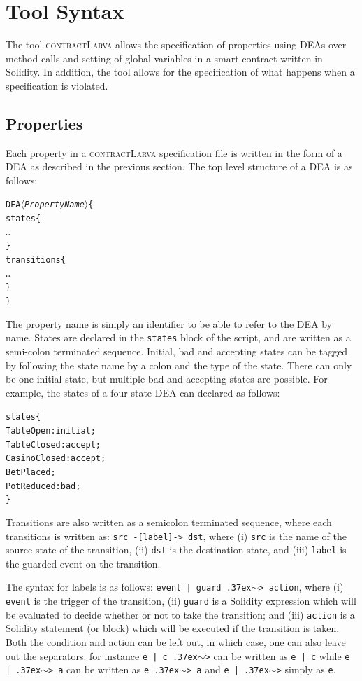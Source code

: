 \documentclass{article}
\newcommand{\contractlarva}{\textsc{contractLarva}\xspace}
\newcommand{\keyword}[1]{\textit{$\langle$#1$\rangle$}}
\newcommand{\tildearrow}{{\raise.37ex\hbox{$\scriptstyle\mathtt{\sim}$}}>\xspace}
\begin{document}
  \section{Tool Syntax}
  The tool \contractlarva allows the specification of properties using DEAs over method calls and setting of global variables in a smart contract written in Solidity. In addition, the tool allows for the specification of what happens when a specification is violated.
  
  \subsection{Properties}
  Each property in a \contractlarva specification file is written in the form of a DEA as described in the previous section. The top level structure of a DEA is as follows:
  
  \small\begin{alltt}
  DEA \keyword{PropertyName} \{
    states \{
      \ldots
    \}
    transitions \{
      \ldots
    \}
  \}
  \end{alltt}\normalsize
 
  The property name is simply an identifier to be able to refer to the DEA by name. States are declared in the \texttt{states} block of the script, and are written as a semi-colon terminated sequence. Initial, bad and accepting states can be tagged by following the state name by a colon and the type of the state. There can only be one initial state, but multiple bad and accepting states are possible. For example, the states of a four state DEA can declared as follows:

  \small\begin{alltt}
    states \{
      TableOpen: initial;
      TableClosed: accept;
      CasinoClosed: accept;
      BetPlaced;
      PotReduced: bad;
    \}
  \end{alltt}\normalsize

  Transitions are also written as a semicolon terminated sequence, where each transitions is written as: \texttt{src -[label]-> dst}, where (i) \texttt{src} is the name of the source state of the transition, (ii) \texttt{dst} is the destination state, and (iii) \texttt{label} is the guarded event on the transition.
  
  The syntax for labels is as follows: \texttt{event | guard \tildearrow action}, where (i) \texttt{event} is the trigger of the transition, (ii) \texttt{guard} is a Solidity expression which will be evaluated to decide whether or not to take the transition; and (iii) \texttt{action} is a Solidity statement (or block) which will be executed if the transition is taken. Both the condition and action can be left out, in which case, one can also leave out the separators: for instance \texttt{e | c \tildearrow} can be written as \texttt{e | c} while \texttt{e | \tildearrow a} can be written as \texttt{e \tildearrow a} and \texttt{e | \tildearrow} simply as \texttt{e}.
  
\end{document}
